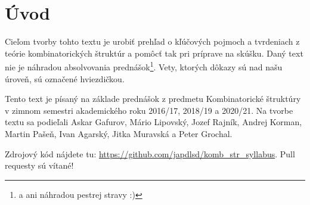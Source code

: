 \chapter*{Úvod}

Cieľom tvorby tohto textu je urobiť prehľad o kľúčových pojmoch a tvrdeniach z teórie kombinatorických štruktúr a pomôcť tak pri príprave na skúšku. 
Daný text nie je náhradou absolvovania prednášok\footnote{a ani náhradou pestrej stravy :)}.
Vety, ktorých dôkazy sú nad našu úroveň, sú označené hviezdičkou.

Tento text je písaný na základe prednášok z predmetu Kombinatorické štruktúry v zimnom semestri akademického roku 2016/17, 2018/19 a 2020/21.
Na tvorbe textu sa podieľali Askar Gafurov, Mário Lipovský, Jozef Rajník, Andrej Korman, Martin Pašeň, Ivan Agarský, Jitka Muravská a Peter Grochal.


Zdrojový kód nájdete tu: \url{https://github.com/japdlsd/komb_str_syllabus}. Pull requesty sú vítané!

